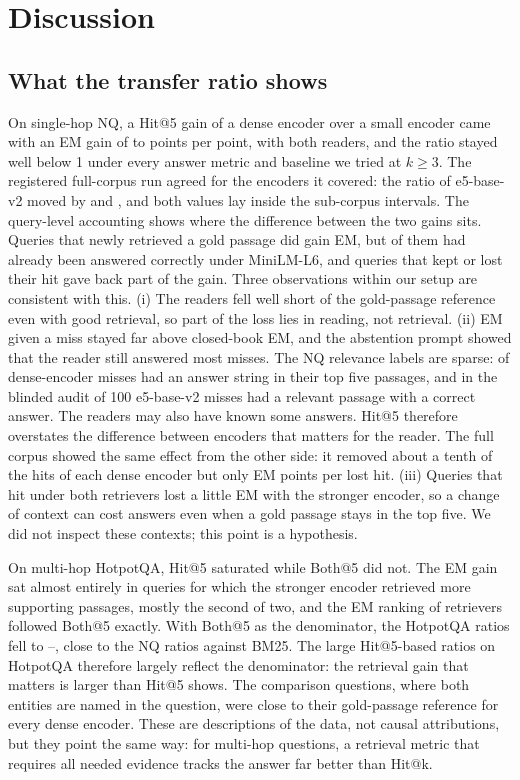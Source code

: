 \section{Discussion}\label{sec:discussion}

\subsection{What the transfer ratio shows}
On single-hop NQ, a Hit@5 gain of a dense encoder over a small encoder came with an EM gain of  to  points per point, with both readers, and the ratio stayed well below 1 under every answer metric and baseline we tried at $k\geq 3$. The registered full-corpus run agreed for the encoders it covered: the ratio of e5-base-v2 moved by  and , and both values lay inside the sub-corpus intervals. The query-level accounting shows where the difference between the two gains sits. Queries that newly retrieved a gold passage did gain EM, but  of them had already been answered correctly under MiniLM-L6, and queries that kept or lost their hit gave back part of the gain. Three observations within our setup are consistent with this. (i) The readers fell well short of the gold-passage reference even with good retrieval, so part of the loss lies in reading, not retrieval. (ii) EM given a miss stayed far above closed-book EM, and the abstention prompt showed that the reader still answered most misses. The NQ relevance labels are sparse:  of dense-encoder misses had an answer string in their top five passages, and in the blinded audit  of 100 e5-base-v2 misses had a relevant passage with a correct answer. The readers may also have known some answers. Hit@5 therefore overstates the difference between encoders that matters for the reader. The full corpus showed the same effect from the other side: it removed about a tenth of the hits of each dense encoder but only  EM points per lost hit. (iii) Queries that hit under both retrievers lost a little EM with the stronger encoder, so a change of context can cost answers even when a gold passage stays in the top five. We did not inspect these contexts; this point is a hypothesis.

On multi-hop HotpotQA, Hit@5 saturated while Both@5 did not. The EM gain sat almost entirely in queries for which the stronger encoder retrieved more supporting passages, mostly the second of two, and the EM ranking of retrievers followed Both@5 exactly. With Both@5 as the denominator, the HotpotQA ratios fell to --, close to the NQ ratios against BM25. The large Hit@5-based ratios on HotpotQA therefore largely reflect the denominator: the retrieval gain that matters is larger than Hit@5 shows. The comparison questions, where both entities are named in the question, were close to their gold-passage reference for every dense encoder. These are descriptions of the data, not causal attributions, but they point the same way: for multi-hop questions, a retrieval metric that requires all needed evidence tracks the answer far better than Hit@k.

